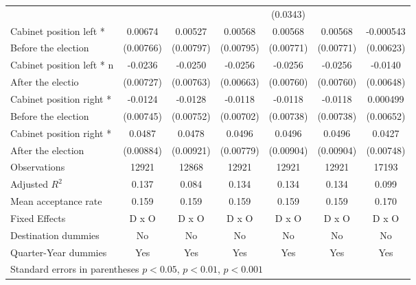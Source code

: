 \begin{table}[!ht]
\begin{tabular}{l*{6}{c}}
                    &                     &                     &                     &    (0.0343)         &                     &                     \\
[0,5em]
Cabinet position left * &     0.00674         &     0.00527         &     0.00568         &     0.00568         &     0.00568         &   -0.000543         \\
Before the election                    &   (0.00766)         &   (0.00797)         &   (0.00795)         &   (0.00771)         &   (0.00771)         &   (0.00623)         \\
[0,5em]
Cabinet position left * n&     -0.0236\sym{**} &     -0.0250\sym{**} &     -0.0256\sym{***}&     -0.0256\sym{**} &     -0.0256\sym{**} &     -0.0140\sym{*}  \\
After the electio                    &   (0.00727)         &   (0.00763)         &   (0.00663)         &   (0.00760)         &   (0.00760)         &   (0.00648)         \\
[0,5em]
Cabinet position right * &     -0.0124         &     -0.0128         &     -0.0118         &     -0.0118         &     -0.0118         &    0.000499         \\
Before the election                    &   (0.00745)         &   (0.00752)         &   (0.00702)         &   (0.00738)         &   (0.00738)         &   (0.00652)         \\
[0,5em]
Cabinet position right *&      0.0487\sym{***}&      0.0478\sym{***}&      0.0496\sym{***}&      0.0496\sym{***}&      0.0496\sym{***}&      0.0427\sym{***}\\
 After the election                    &   (0.00884)         &   (0.00921)         &   (0.00779)         &   (0.00904)         &   (0.00904)         &   (0.00748)         \\
\hline
Observations        &       12921         &       12868         &       12921         &       12921         &       12921         &       17193         \\
Adjusted \(R^{2}\)  &       0.137         &       0.084         &       0.134         &       0.134         &       0.134         &       0.099         \\
Mean acceptance rate&       0.159         &       0.159         &       0.159         &       0.159         &       0.159         &       0.170         \\
Fixed Effects       &       D x O         &       D x O         &       D x O         &       D x O         &       D x O         &       D x O         \\
Destination dummies &          No         &          No         &          No         &          No         &          No         &          No         \\
Quarter-Year dummies&         Yes         &         Yes         &         Yes         &         Yes         &         Yes         &         Yes         \\
\hline\hline
\multicolumn{7}{l}{ Standard errors in parentheses \sym{*} \(p<0.05\), \sym{**} \(p<0.01\), \sym{***} \(p<0.001\)}\\
\end{tabular}
\end{table}
